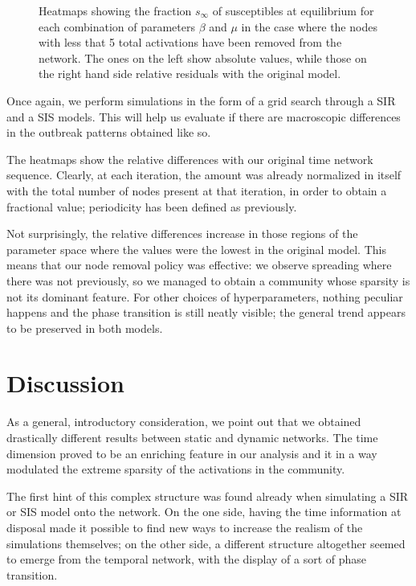 \documentclass[a4paper,11pt, twocolumn]{article}
\begin{document}
\begin{figure}[H]
\caption{Heatmaps showing the fraction $s_{\infty}$ of susceptibles at equilibrium for each combination of parameters $\beta$ and $\mu$ in the case where the nodes with less that 5 total activations have been removed from the network. The ones on the left show absolute values, while those on the right hand side relative residuals with the original model.}
\end{figure}

Once again, we perform simulations in the form of a grid search through a SIR and a SIS models. This will help us evaluate if there are macroscopic differences in the outbreak patterns obtained like so.

The heatmaps show the relative differences with our original time network sequence. Clearly, at each iteration, the amount was already normalized in itself with the total number of nodes present at that iteration, in order to obtain a fractional value; periodicity has been defined as previously.

Not surprisingly, the relative differences increase in those regions of the parameter space where the values were the lowest in the original model. This means that our node removal policy was effective: we observe spreading where there was not previously, so we managed to obtain a community whose sparsity is not its dominant feature. For other choices of hyperparameters, nothing peculiar happens and the phase transition is still neatly visible; the general trend appears to be preserved in both models. 


\section{Discussion}
As a general, introductory consideration, we point out that we obtained drastically different results between static and dynamic networks. The time dimension proved to be an enriching feature in our analysis and it in a way modulated the extreme sparsity of the activations in the community.

The first hint of this complex structure was found already when simulating a SIR or SIS model onto the network. On the one side, having the time information at disposal made it possible to find new ways to increase the realism of the simulations themselves; on the other side, a different structure altogether seemed to emerge from the temporal network, with the display of a sort of phase transition.
\end{document}
